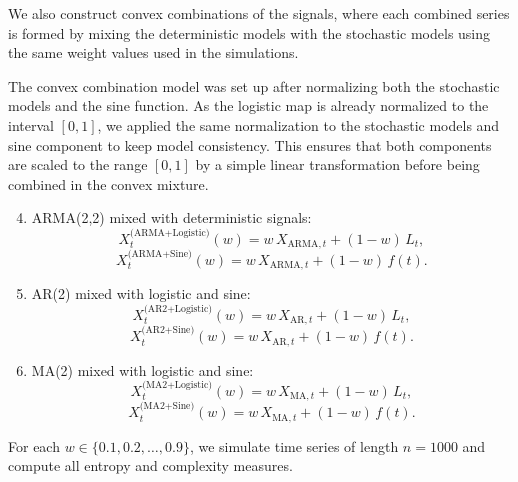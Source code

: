 \documentclass[12pt,a4paper]{article}
\begin{document}

We also construct convex combinations of the signals, where each combined series is formed by mixing the deterministic models with the stochastic models using the same weight values used in the simulations.



The convex combination model was set up after normalizing both the stochastic models and the sine function. As the logistic map is already normalized to the interval $[0, 1]$, we applied the same normalization to the stochastic models and sine component to keep model consistency. This ensures that both components are scaled to the range $[0, 1]$ by a simple linear transformation before being combined in the convex mixture.
 

\begin{enumerate}
	\setcounter{enumi}{3}
	
	\item ARMA(2,2) mixed with deterministic signals:
	\[
	X^{\text{(ARMA+Logistic)}}_t(w) = w\, X_{\text{ARMA},t} + (1 - w)\, L_t,
	\]
	\[
	X^{\text{(ARMA+Sine)}}_t(w) = w\, X_{\text{ARMA},t} + (1 - w)\, f(t).
	\]
	
	\item AR(2) mixed with logistic and sine:
	\[
	X^{\text{(AR2+Logistic)}}_t(w) = w\, X_{\text{AR},t} + (1 - w)\, L_t,
	\]
	\[
	X^{\text{(AR2+Sine)}}_t(w) = w\, X_{\text{AR},t} + (1 - w)\, f(t).
	\]
	
	\item MA(2) mixed with logistic and sine:
	\[
	X^{\text{(MA2+Logistic)}}_t(w) = w\, X_{\text{MA},t} + (1 - w)\, L_t,
	\]
	\[
	X^{\text{(MA2+Sine)}}_t(w) = w\, X_{\text{MA},t} + (1 - w)\, f(t).
	\]
\end{enumerate}

For each $w \in \{0.1,0.2,\dots,0.9\}$, we simulate time series of length $n=1000$ and compute all entropy and complexity measures.
\end{document}
